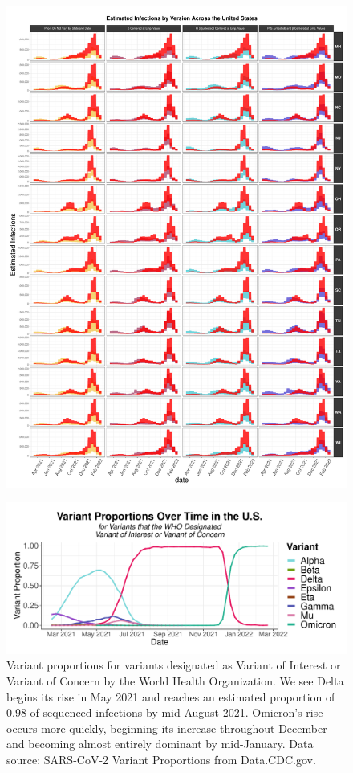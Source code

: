 \documentclass[12pt,twoside]{smiththesis}
\begin{document}
\begin{figure}
\includegraphics[width=1\linewidth]{figure/state_comp_covidestim2} \caption{\label{fig:state-results-2}}\label{fig:unnamed-chunk-5}
\end{figure}
\begin{figure}
\includegraphics[width=1\linewidth]{figure/variant_prop} \caption{\label{fig:variant-prop.jpeg}Variant proportions for variants designated as Variant of Interest or Variant of Concern by the World Health Organization. We see Delta begins its rise in May 2021 and reaches an estimated proportion of 0.98 of sequenced infections by mid-August 2021. Omicron's rise occurs more quickly, beginning its increase throughout December and becoming almost entirely dominant by mid-January.
Data source: SARS-CoV-2 Variant Proportions from Data.CDC.gov.}\label{fig:unnamed-chunk-6}
\end{figure}
\end{document}
